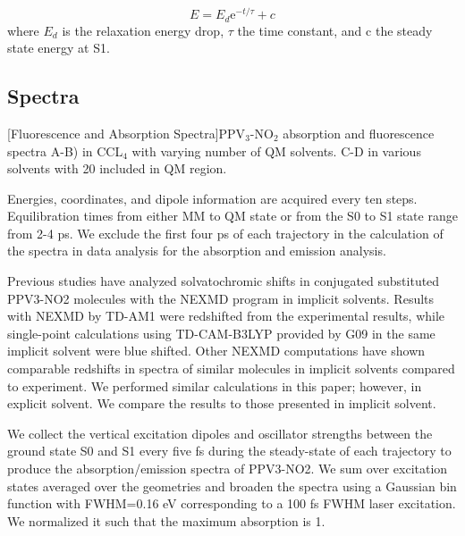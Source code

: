 \begin{equation}
E = E_d \text{e}^{-t/\tau} + c
\end{equation}
where \(E_d\) is the relaxation energy drop, \(\tau\) the time constant, and c the steady state energy at S1.

\subsection{Spectra}

\noindent
\begin{multiFigure} 
  [Fluorescence and Absorption Spectra]{PPV\(_3\)-NO\(_2\) absorption and fluorescence spectra A-B) in CCL\(_4\) with varying number of QM solvents. C-D in various solvents with 20 included in QM region.}
  \label{fig:}
\end{multiFigure}\bigskip


    Energies, coordinates, and dipole information are acquired every ten steps.
    Equilibration times from either MM to QM state or from the S0 to S1 state range from 2-4 ps.
    We exclude the first four ps of each trajectory in the calculation of the spectra in data analysis for the absorption and emission analysis. 

    Previous studies have analyzed solvatochromic shifts in conjugated substituted PPV3-NO2 molecules with the NEXMD program in implicit solvents.
    Results with NEXMD by TD-AM1 were redshifted from the experimental results, while single-point calculations using TD-CAM-B3LYP provided by G09 in the same implicit solvent were blue shifted.
    Other NEXMD computations have shown comparable redshifts in spectra of similar molecules in implicit solvents compared to experiment. \cite{Bjorgaard2015}
    We performed similar calculations in this paper; however, in explicit solvent.
    We compare the results to those presented in implicit solvent.

    We collect the vertical excitation dipoles and oscillator strengths between the ground state S0 and S1 every five fs during the steady-state of each trajectory to produce the absorption/emission spectra of PPV3-NO2.
    We sum over excitation states averaged over the geometries and broaden the spectra using a Gaussian bin function with FWHM=0.16 eV corresponding to a 100 fs FWHM laser excitation.
    We normalized it such that the maximum absorption is 1. 

